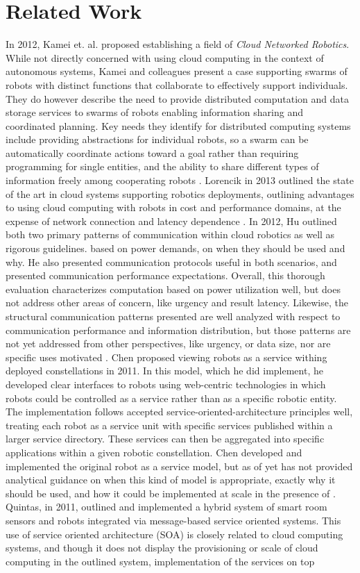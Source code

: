\documentclass{sig-alternate}
\begin{document}
\section{Related Work}
In 2012, Kamei et. al. proposed establishing a field of {\sl Cloud Networked Robotics}.  While not directly concerned with using cloud computing in the context of autonomous systems, Kamei and colleagues present a case supporting swarms of robots with distinct functions that collaborate to effectively support individuals.  They do however describe the need to provide distributed computation and data storage services to swarms of robots enabling information sharing and coordinated planning.  Key needs they identify for distributed computing systems include providing abstractions for individual robots, so a swarm can be automatically coordinate actions toward a goal rather than requiring programming for single entities, and the ability to share different types of information freely among cooperating robots \cite{KaNiHaSa:12}.  Lorencik in 2013 outlined the state of the art in cloud systems supporting robotics deployments, outlining advantages to using cloud computing with robots in cost and performance domains, at the expense of network connection and latency dependence \cite{LoSi:13}.  In 2012, Hu outlined both two primary patterns of communication within cloud robotics as well as rigorous guidelines. based on power demands, on when they should be used and why.  He also presented communication protocols useful in both scenarios, and presented communication performance expectations.  Overall, this thorough evaluation characterizes computation based on power utilization well, but does not address other areas of concern, like urgency and result latency.  Likewise, the structural communication patterns presented are well analyzed with respect to communication performance and information distribution, but those patterns are not yet addressed from other perspectives, like urgency, or data size, nor are specific uses motivated \cite{HuWeYo:12}.  Chen proposed viewing robots as a service withing deployed constellations in 2011.  In this model, which he did implement, he developed clear interfaces to robots using web-centric technologies in which robots could be controlled as a service rather than as a specific robotic entity. The implementation follows accepted service-oriented-architecture principles well, treating each robot as a service unit with specific services published within a larger service directory.  These services can then be aggregated into specific applications within a given robotic constellation.  Chen developed and implemented the original robot as a service model, but as of yet has not provided analytical guidance on when this kind of model is appropriate, exactly why it should be used, and how it could be implemented at scale in the presence of  \cite{YiZhGa:10}.  Quintas, in 2011, outlined and implemented a hybrid system of smart room sensors and robots integrated via message-based service oriented systems.  This use of service oriented architecture (SOA) is closely related to cloud computing systems, and though it does not display the provisioning or scale of cloud computing in the outlined system, implementation of the services on top 
\end{document}
